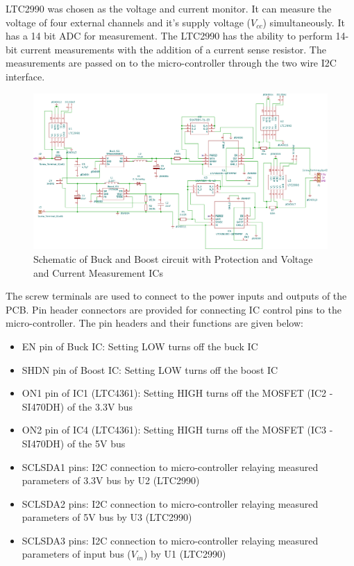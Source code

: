  LTC2990 was chosen as the voltage  and current monitor. It can measure the voltage of four external channels and it's supply voltage ($V_{cc}$) simultaneously. It has a 14 bit ADC for measurement. The LTC2990 has the ability to perform 14-bit current measurements with the addition of a current sense resistor. The measurements are passed on to the micro-controller through the two wire I2C interface.
 \begin{center}
 \begin{figure}[h]
 	\centering
 	\includegraphics[width=\columnwidth]{bubowithprotn.pdf}
 	\caption{\centering Schematic of Buck and Boost circuit with Protection and Voltage and Current Measurement ICs}
 	\label{fig:bubo2}
 \end{figure}
\end{center}
The screw terminals are used to connect to the power inputs and outputs of the PCB. Pin header connectors are provided for connecting IC control pins to the micro-controller. The pin headers and their functions are given below:
 \begin{itemize}
 	\item EN pin of Buck IC: Setting LOW turns off the buck IC
 	\item SHDN pin of Boost IC: Setting LOW turns off the boost IC
 	\item ON1 pin of IC1 (LTC4361): Setting HIGH turns off the MOSFET (IC2 - SI470DH) of the 3.3V bus
 	\item ON2 pin of IC4 (LTC4361): Setting HIGH turns off the MOSFET (IC3 - SI470DH) of the 5V bus
 	\item SCLSDA1 pins: I2C connection to micro-controller relaying measured parameters of 3.3V bus by U2 (LTC2990) 
 	\item SCLSDA2 pins: I2C connection to micro-controller relaying measured parameters of 5V bus by U3 (LTC2990) 
 	\item SCLSDA3 pins: I2C connection to micro-controller relaying measured parameters of input bus ($V_{in}$) by U1 (LTC2990)
 \end{itemize}
